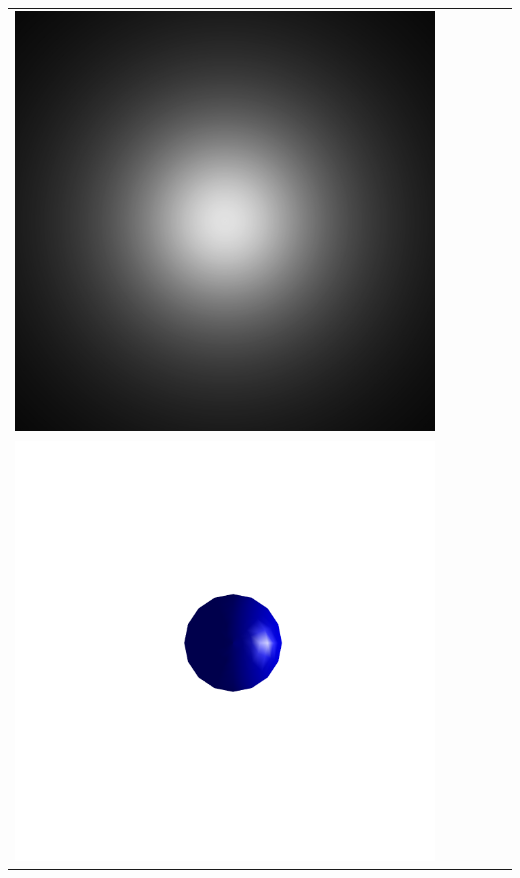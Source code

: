 \begin{teaserfigure}
\begin{tabular}{cccccc}
        \includegraphics[height=\resLen]{images/slab/pos.jpg}
        \\
        \includegraphics[height=\resLen]{images/particle/300nm_N1.png} &

\end{tabular}
\end{teaserfigure}
